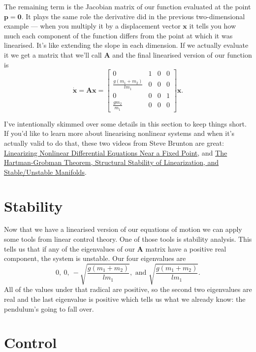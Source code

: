 \documentclass{article}
\renewcommand{\vec}[1]{\boldsymbol{\mathbf{#1}}}
\newcommand{\dvec}[1]{\dot{\vec{#1}}}
\begin{document}
The remaining term is the Jacobian matrix of our function evaluated at the point $\vec{p} = \vec{0}$. It plays the same role the derivative did in the previous two-dimensional example — when you multiply it by a displacement vector $\vec{x}$ it tells you how much each component of the function differs from the point at which it was linearised. It's like extending the slope in each dimension. If we actually evaluate it we get a matrix that we'll call $\vec{A}$ and the final linearised version of our function is \[\dvec{x} = \vec{A} \vec{x} = \begin{bmatrix}
    0                           & 1 & 0 & 0 \\
    \frac{g (m_1 + m_2)}{l m_1} & 0 & 0 & 0 \\
    0                           & 0 & 0 & 1 \\
    \frac{g m_2}{m_1}           & 0 & 0 & 0
  \end{bmatrix} \vec{x}.\]

I've intentionally skimmed over some details in this section to keep things short. If you'd like to learn more about linearising nonlinear systems and when it's actually valid to do that, these two videos from Steve Brunton are great: \href{https://www.youtube.com/watch?v=RCWkzzLgwf0}{Linearizing Nonlinear Differential Equations Near a Fixed Point}, and \href{https://www.youtube.com/watch?v=vRaUSnB7qNw}{The Hartman-Grobman Theorem, Structural Stability of Linearization, and Stable/Unstable Manifolds}.

\section{Stability}

Now that we have a linearised version of our equations of motion we can apply some tools from linear control theory. One of those tools is stability analysis. This tells us that if any of the eigenvalues of our $\vec{A}$ matrix have a positive real component, the system is unstable. Our four eigenvalues are \[0, \ 0, \ -\sqrt{\frac{g (m_1 + m_2)}{l m_1}}, \text{ and } \sqrt{\frac{g (m_1 + m_2)}{l m_1}}.\] All of the values under that radical are positive, so the second two eigenvalues are real and the last eigenvalue is positive which tells us what we already know: the pendulum's going to fall over.

\section{Control}
\end{document}
